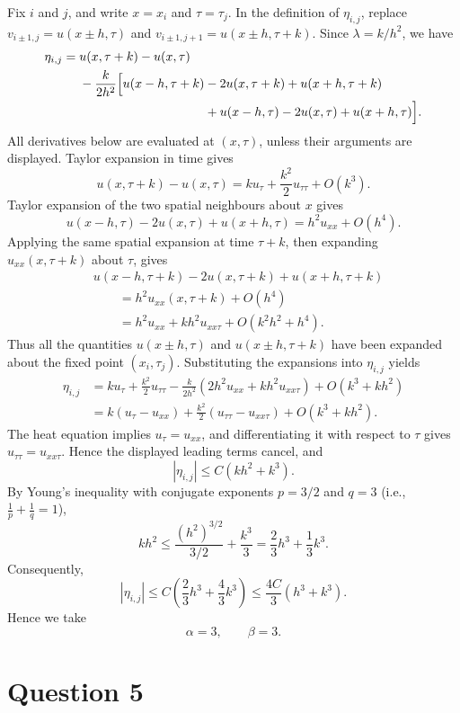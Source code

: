 \documentclass{article}
\begin{document}
Fix \(i\) and \(j\), and write \(x=x_i\) and \(\tau=\tau_j\).
In the definition of \(\eta_{i,j}\), replace
\(v_{i\pm1,j}=u(x\pm h,\tau)\) and
\(v_{i\pm1,j+1}=u(x\pm h,\tau+k)\). Since
\(\lambda=k/h^2\), we have
\[
\begin{aligned}
\eta_{i,j}
={}&u(x,\tau+k)-u(x,\tau)\\
&-\frac{k}{2h^2}
 \Bigl[
 u(x-h,\tau+k)-2u(x,\tau+k)+u(x+h,\tau+k)\\
&\hspace{35mm}
 +u(x-h,\tau)-2u(x,\tau)+u(x+h,\tau)
 \Bigr].
\end{aligned}
\]
All derivatives below are evaluated at \((x,\tau)\), unless their
arguments are displayed. Taylor expansion in time gives
\[
u(x,\tau+k)-u(x,\tau)
=ku_\tau+\frac{k^2}{2}u_{\tau\tau}+O(k^3).
\]
Taylor expansion of the two spatial neighbours about \(x\) gives
\[
u(x-h,\tau)-2u(x,\tau)+u(x+h,\tau)
=h^2u_{xx}+O(h^4).
\]
Applying the same spatial expansion at time \(\tau+k\), then expanding
\(u_{xx}(x,\tau+k)\) about \(\tau\), gives
\[
\begin{aligned}
&u(x-h,\tau+k)-2u(x,\tau+k)+u(x+h,\tau+k)\\
&\qquad=h^2u_{xx}(x,\tau+k)+O(h^4)\\
&\qquad=h^2u_{xx}+kh^2u_{xx\tau}
          +O(k^2h^2+h^4).
\end{aligned}
\]
Thus all the quantities \(u(x\pm h,\tau)\) and \(u(x\pm h,\tau+k)\)
have been expanded about the fixed point \((x_i,\tau_j)\).
Substituting the expansions into \(\eta_{i,j}\) yields
\[
\begin{aligned}
\eta_{i,j}
&=ku_\tau+\frac{k^2}{2}u_{\tau\tau}
 -\frac{k}{2h^2}
  \left(2h^2u_{xx}+kh^2u_{xx\tau}\right)
 +O(k^3+kh^2)\\
&=k(u_\tau-u_{xx})
 +\frac{k^2}{2}(u_{\tau\tau}-u_{xx\tau})
 +O(k^3+kh^2).
\end{aligned}
\]
The heat equation implies \(u_\tau=u_{xx}\), and differentiating
it with respect to \(\tau\) gives
\(u_{\tau\tau}=u_{xx\tau}\). Hence the displayed leading terms
cancel, and
\[
|\eta_{i,j}|\le C(kh^2+k^3).
\]
By Young's inequality with conjugate exponents
\(p=3/2\) and \(q=3\) (i.e., $\frac{1}{p}+\frac{1}{q}=1$),
\[
kh^2
\le \frac{(h^2)^{3/2}}{3/2}+\frac{k^3}{3}
=\frac23h^3+\frac13k^3.
\]
Consequently,
\[
|\eta_{i,j}|
\le C\left(\frac23h^3+\frac43k^3\right)
\le \frac{4C}{3}(h^3+k^3).
\]
Hence we take
\[
\boxed{\alpha=3,\qquad\beta=3.}
\]

\section*{Question 5}
\end{document}
